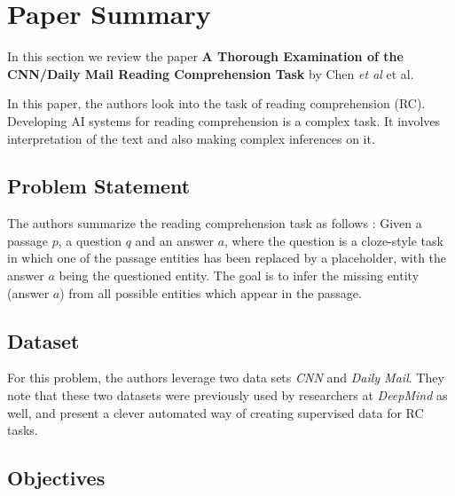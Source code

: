 \section{Paper Summary}
\label{sec:papersummary}

In this section we review the paper \textbf{A Thorough Examination of the CNN/Daily Mail Reading Comprehension Task} by Chen {\it et al} \cite{chen2016thorough} et al.

In this paper, the authors look into the task of reading comprehension (RC). Developing AI systems for reading comprehension is a complex task. It involves interpretation of the text and also making complex inferences on it.

\subsection{Problem Statement}
\label{subsec:problemstatement}

The authors summarize the reading comprehension task as follows : Given a passage $p$, a question $q$ and an answer $a$, where the question is a cloze-style task in which one of the passage entities has been replaced by a placeholder, with the answer $a$ being the questioned entity. The goal is to infer the missing entity (answer $a$) from all possible entities which appear in the passage. 

\subsection{Dataset}
\label{subsec:dataset}

For this problem, the authors leverage two data sets \textit{CNN} and \textit{Daily Mail}. They note that these two datasets were previously used by researchers at \textit{DeepMind} \cite{hermann2015teaching} as well, and present a clever automated way of creating supervised data for RC tasks.

\subsection{Objectives}
\label{subsec:objectives}

